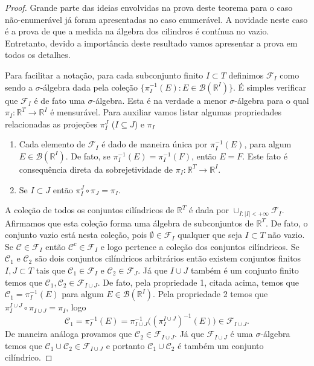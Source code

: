 \begin{proof}
Grande parte das ideias envolvidas na prova deste teorema 
para o caso não-enumerável já foram apresentadas no caso
enumerável. A novidade neste caso é a prova de que a 
medida na álgebra dos cilindros é contínua no vazio.
Entretanto, devido a importância deste resultado vamos apresentar
a prova em todos os detalhes.

Para facilitar a notação, 
para cada subconjunto finito $I\subset T$ definimos 
$\mathcal{F}_{I}$ como sendo a $\sigma$-álgebra
dada pela coleção 
$\{\pi^{-1}_{I}(E): E\in\mathscr{B}(\mathbb{R}^{I}) \}$.
É simples verificar que $\mathcal{F}_{I}$ é de fato uma 
$\sigma$-álgebra. Esta é na verdade a menor $\sigma$-álgebra
para o qual $\pi_{I}:\mathbb{R}^{T}\to \mathbb{R}^I$ é 
mensurável. Para auxiliar vamos listar algumas propriedades
relacionadas as projeções $\pi^{J}_{I}$ ($I\subseteq J$)  e $\pi_{I}$
\begin{enumerate}

\item Cada elemento de $\mathcal{F}_I$ é dado de maneira única 
por $\pi^{-1}_{I}(E)$, para algum $E\in\mathscr{B}(\mathbb{R}^{I})$.
De fato, se $\pi^{-1}_{I}(E) = \pi^{-1}_{I}(F)$, então $E=F$. Este
fato é consequência direta da sobrejetividade de 
$\pi_{I}:\mathbb{R}^{T}\to\mathbb{R}^{I}$.


\item Se $I\subset J$ então $\pi^{J}_{I}\circ \pi_{J} = \pi_{I}$.

\end{enumerate}

A coleção de todos os conjuntos cilíndricos de
$\mathbb{R}^{T}$ é dada por $\cup_{I:|I|<+\infty} \mathcal{F}_{I}$.
Afirmamos que esta coleção forma uma álgebra de subconjuntos de 
$\mathbb{R}^{T}$. De fato, o conjunto vazio está nesta coleção, 
pois $\emptyset\in \mathcal{F}_{I}$ qualquer que seja $I\subset T$
não vazio. Se $\mathcal{C}\in \mathcal{F}_{I}$ então 
$\mathcal{C}^c\in\mathcal{F}_{I}$ e logo pertence a coleção dos conjuntos
cilíndricos. Se $\mathcal{C}_1$ e $\mathcal{C}_2$ são dois conjuntos cilíndricos 
arbitrários então existem conjuntos finitos $I,J\subset T$ 
tais que $\mathcal{C}_1\in \mathcal{F}_{I}$ e 
$\mathcal{C}_2\in \mathcal{F}_{J}$. 
Já que $I\cup J$ também é um conjunto finito
temos que $\mathcal{C}_1,\mathcal{C}_2\in \mathcal{F}_{I\cup J}$.
De fato, pela propriedade 1, citada acima,
temos que $\mathcal{C}_1 = \pi^{-1}_{I}(E)$ para algum 
$E\in \mathscr{B}(\mathbb{R}^I)$. Pela propriedade 2 temos que 
$\pi_{I}^{I\cup J}\circ \pi_{I\cup J} = \pi_{I}$,
logo 
\[
\mathcal{C}_1
=
\pi_{I}^{-1}(E)
=
\pi^{-1}_{I\cup J}\Big( (\pi_{I}^{I\cup J})^{-1}(E) \Big)
\in 
\mathcal{F}_{I\cup J}.
\]
De maneira análoga provamos que $\mathcal{C}_2\in \mathcal{F}_{I\cup J}$.
Já que $\mathcal{F}_{I\cup J}$ é uma $\sigma$-álgebra 
temos que $\mathcal{C}_1\cup \mathcal{C}_2 \in \mathcal{F}_{I\cup J}$ 
e portanto $\mathcal{C}_1\cup \mathcal{C}_2$ é também um conjunto cilíndrico.



\end{proof}
